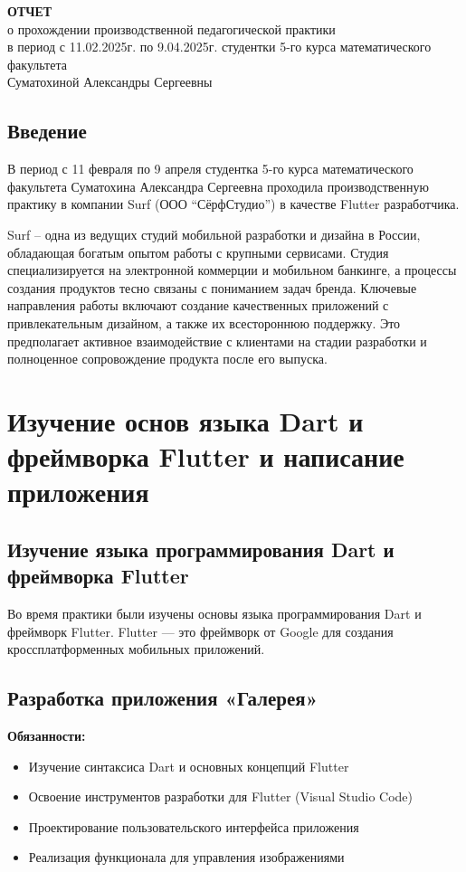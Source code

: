 \documentclass[a4paper, 12pt]{extarticle}
\begin{document}
\begin{center}
    \textbf{ОТЧЕТ}\\
    о прохождении производственной педагогической практики\\
    в период с 11.02.2025г. по 9.04.2025г.
    студентки 5-го курса математического факультета\\
    Суматохиной Александры Сергеевны
    \end{center}

\subsection*{Введение}

В период с 11 февраля по 9 апреля студентка 5-го курса математического факультета Суматохина Александра Сергеевна проходила производственную практику в компании Surf (ООО “СёрфСтудио”) в качестве Flutter разработчика.

Surf – одна из ведущих студий мобильной разработки и дизайна в России, обладающая богатым опытом работы с крупными сервисами. Студия специализируется на электронной коммерции и мобильном банкинге, а процессы создания продуктов тесно связаны с пониманием задач бренда. Ключевые направления работы включают создание качественных приложений с привлекательным дизайном, а также их всестороннюю поддержку. Это предполагает активное взаимодействие с клиентами на стадии разработки и полноценное сопровождение продукта после его выпуска.

\section{Изучение основ языка Dart и фреймворка Flutter и написание приложения}
\subsection{Изучение языка программирования Dart и фреймворка Flutter}
Во время практики были изучены основы языка программирования Dart и фреймворк Flutter. Flutter — это фреймворк от Google для создания кроссплатформенных мобильных приложений.

\subsection{Разработка приложения «Галерея»}
\textbf{Обязанности:}
\begin{itemize}
    \item Изучение синтаксиса Dart и основных концепций Flutter
    \item Освоение инструментов разработки для Flutter (Visual Studio Code)
    \item Проектирование пользовательского интерфейса приложения
    \item Реализация функционала для управления изображениями
\end{itemize}
\end{document}
